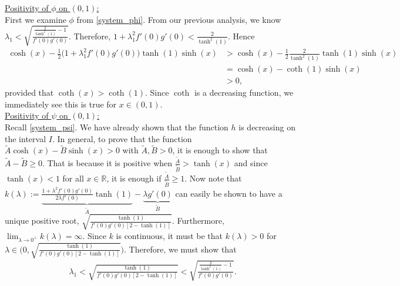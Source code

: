 \documentclass[12pt, reqno]{amsart}
\numberwithin{equation}{section}
\begin{document}

\underline{Positivity of $\phi$ on $(0,1)$:} \\

First we examine $\phi$ from \eqref{system_phi}. From our previous analysis, we know $\lambda_1 < \sqrt{\frac{\frac{2}{\tanh^2(1)}-1}{f'(0)g'(0)}}$. Therefore, $1 + \lambda_1^2 f'(0) g'(0) < \frac{2}{\tanh^2(1)}$. Hence 
\begin{align*} 
    \cosh(x) - \frac{1}{2} \Big( 1 + \lambda_1^2 f'(0) g'(0) \Big) \tanh(1) \sinh(x) 
        &> \cosh(x) - \frac{1}{2} \frac{2}{\tanh^2(1)} \tanh(1) \sinh(x) \\
        &= \cosh(x) - \coth(1) \sinh(x) \\
        &> 0,
\end{align*}
provided that $\coth(x) > \coth(1)$. Since $\coth$ is a decreasing function, we immediately see this is true for $x \in (0, 1)$. \\

\underline{Positivity of $\psi$ on $(0,1)$:} \\

Recall \eqref{system_psi}. We have already shown that the function $h$ is decreasing on the interval $I$. In general, to prove that the function $\tilde{A} \cosh(x) - \tilde{B} \sinh(x) > 0$ with $\tilde{A}, \tilde{B} > 0$, it is enough to show that $\tilde{A} - \tilde{B} \geq 0$. That is because it is positive when $\frac{\tilde{A}}{\tilde{B}} > \tanh(x)$ and since $\tanh(x) < 1$ for all $x \in \mathbb{R}$, it is enough if $\frac{\tilde{A}}{\tilde{B}} \geq 1$. Now note that $k(\lambda) := \underbrace{\frac{1+\lambda^2 f'(0)g'(0)}{2\lambda f'(0)} \tanh(1)}_{\tilde{A}} - \underbrace{\lambda g'(0)}_{\tilde{B}}$ can easily be shown to have a unique positive root, $\sqrt{\frac{\tanh(1)}{f'(0)g'(0)[2-\tanh(1)]}}$. Furthermore, $\displaystyle \lim_{\lambda \rightarrow 0^{+}} k(\lambda) = \infty$. Since $k$ is continuous, it must be that $k(\lambda) > 0$ for $\lambda \in \Big(0, \sqrt{\frac{\tanh(1)}{f'(0)g'(0)[2-\tanh(1)]}} \Big)$. Therefore, we must show that 
\begin{align*} 
    \lambda_1 
    < \sqrt{\frac{\tanh(1)}{f'(0)g'(0)[2-
       \tanh(1)]}} 
    < \sqrt{\frac{\frac{2}{\tanh^2(1)}-1}
      {f'(0)g'(0)}}.
\end{align*} 
\end{document}
